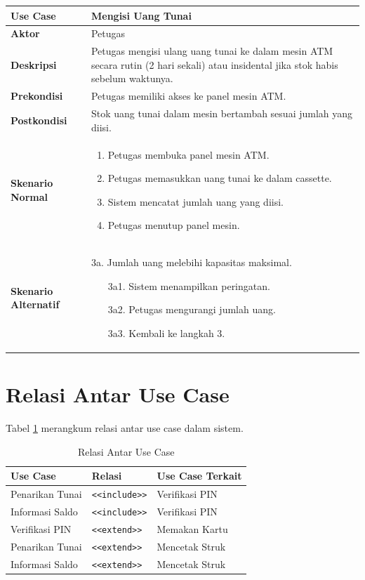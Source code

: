 \documentclass[conference,10pt]{IEEEtran}
\begin{document}
\begin{center}
\begin{tabular}{|L{2.3cm}|L{5cm}|}
\hline
\textbf{Use Case} & Mengisi Uang Tunai \\
\hline
\textbf{Aktor} & Petugas \\
\hline
\textbf{Deskripsi} & Petugas mengisi ulang uang tunai ke dalam mesin ATM secara rutin (2 hari sekali) atau insidental jika stok habis sebelum waktunya. \\
\hline
\textbf{Prekondisi} & Petugas memiliki akses ke panel mesin ATM. \\
\hline
\textbf{Postkondisi} & Stok uang tunai dalam mesin bertambah sesuai jumlah yang diisi. \\
\hline
\textbf{Skenario Normal} &
\begin{enumerate}
\setlength\itemsep{0pt}
\item Petugas membuka panel mesin ATM.
\item Petugas memasukkan uang tunai ke dalam cassette.
\item Sistem mencatat jumlah uang yang diisi.
\item Petugas menutup panel mesin.
\end{enumerate} \\
\hline
\textbf{Skenario Alternatif} &
3a. Jumlah uang melebihi kapasitas maksimal.
\begin{enumerate}
\setlength\itemsep{0pt}
\item[3a1.] Sistem menampilkan peringatan.
\item[3a2.] Petugas mengurangi jumlah uang.
\item[3a3.] Kembali ke langkah 3.
\end{enumerate} \\
\hline
\end{tabular}
\end{center}

\section{Relasi Antar Use Case}

Tabel \ref{tbl:relasi} merangkum relasi antar use case dalam sistem.

\begin{table}[H]
\centering
\caption{Relasi Antar Use Case}
\label{tbl:relasi}
\begin{tabular}{|l|l|l|}
\hline
\textbf{Use Case} & \textbf{Relasi} & \textbf{Use Case Terkait} \\
\hline
Penarikan Tunai & \texttt{<<include>>} & Verifikasi PIN \\
Informasi Saldo & \texttt{<<include>>} & Verifikasi PIN \\
Verifikasi PIN & \texttt{<<extend>>} & Memakan Kartu \\
Penarikan Tunai & \texttt{<<extend>>} & Mencetak Struk \\
Informasi Saldo & \texttt{<<extend>>} & Mencetak Struk \\
\hline
\end{tabular}
\end{table}
\end{document}
